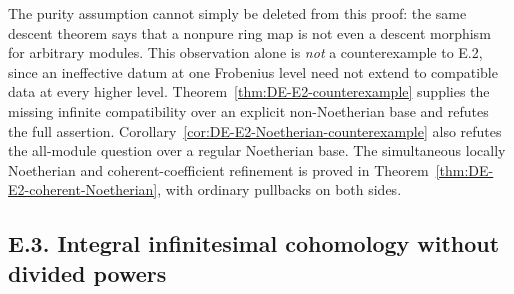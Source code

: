 The purity assumption cannot simply be deleted from this proof: the same descent theorem says that a nonpure ring map is not even a descent morphism for arbitrary modules.  This observation alone is \emph{not} a counterexample to E.2, since an ineffective datum at one Frobenius level need not extend to compatible data at every higher level.  Theorem~\ref{thm:DE-E2-counterexample} supplies the missing infinite compatibility over an explicit non-Noetherian base and refutes the full assertion.  Corollary~\ref{cor:DE-E2-Noetherian-counterexample} also refutes the all-module question over a regular Noetherian base.  The simultaneous locally Noetherian and coherent-coefficient refinement is proved in Theorem~\ref{thm:DE-E2-coherent-Noetherian}, with ordinary pullbacks on both sides.


\subsection{E.3. Integral infinitesimal cohomology without divided powers}

